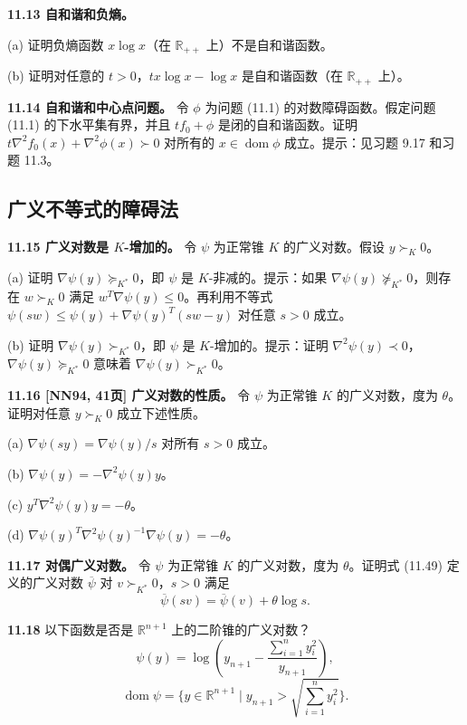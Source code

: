 \documentclass[UTF8,12pt,a4paper,fontset=fandol]{ctexart}
\begin{document}
\noindent\textbf{11.13 自和谐和负熵。}

(a) 证明负熵函数 $x\log x$（在 $\mathbb{R}_{++}$ 上）不是自和谐函数。

(b) 证明对任意的 $t>0$，$tx\log x-\log x$ 是自和谐函数（在 $\mathbb{R}_{++}$ 上）。

\noindent\textbf{11.14 自和谐和中心点问题。} 令 $\phi$ 为问题 (11.1) 的对数障碍函数。假定问题 (11.1) 的下水平集有界，并且 $tf_0+\phi$ 是闭的自和谐函数。证明 $t\nabla^2 f_0(x)+\nabla^2\phi(x)\succ 0$ 对所有的 $x\in\operatorname{dom}\phi$ 成立。提示：见习题 9.17 和习题 11.3。

\subsection*{广义不等式的障碍法}

\noindent\textbf{11.15 广义对数是 $K$-增加的。} 令 $\psi$ 为正常锥 $K$ 的广义对数。假设 $y\succ_K 0$。

(a) 证明 $\nabla\psi(y)\succeq_{K^\ast} 0$，即 $\psi$ 是 $K$-非减的。提示：如果 $\nabla\psi(y)\not\succeq_{K^\ast}0$，则存在 $w\succ_K 0$ 满足 $w^T\nabla\psi(y)\leq 0$。再利用不等式 $\psi(sw)\leq \psi(y)+\nabla\psi(y)^T(sw-y)$ 对任意 $s>0$ 成立。

(b) 证明 $\nabla\psi(y)\succ_{K^\ast}0$，即 $\psi$ 是 $K$-增加的。提示：证明 $\nabla^2\psi(y)\prec 0$，$\nabla\psi(y)\succeq_{K^\ast}0$ 意味着 $\nabla\psi(y)\succ_{K^\ast}0$。

\noindent\textbf{11.16 [NN94, 41页] 广义对数的性质。} 令 $\psi$ 为正常锥 $K$ 的广义对数，度为 $\theta$。证明对任意 $y\succ_K0$ 成立下述性质。

(a) $\nabla\psi(sy)=\nabla\psi(y)/s$ 对所有 $s>0$ 成立。

(b) $\nabla\psi(y)=-\nabla^2\psi(y)y$。

(c) $y^T\nabla^2\psi(y)y=-\theta$。

(d) $\nabla\psi(y)^T\nabla^2\psi(y)^{-1}\nabla\psi(y)=-\theta$。

\noindent\textbf{11.17 对偶广义对数。} 令 $\psi$ 为正常锥 $K$ 的广义对数，度为 $\theta$。证明式 (11.49) 定义的广义对数 $\overline{\psi}$ 对 $v\succ_{K^\ast}0$，$s>0$ 满足
\[
\overline{\psi}(sv)=\overline{\psi}(v)+\theta\log s.
\]

\noindent\textbf{11.18} 以下函数是否是 $\mathbb{R}^{n+1}$ 上的二阶锥的广义对数？
\[
\psi(y)=\log\left(y_{n+1}-\frac{\sum_{i=1}^n y_i^2}{y_{n+1}}\right),
\]
\[
\operatorname{dom}\psi=\{y\in\mathbb{R}^{n+1}\mid y_{n+1}>\sqrt{\sum_{i=1}^n y_i^2}\}.
\]
\end{document}
